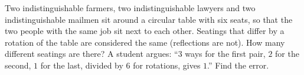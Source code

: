 Two indistinguishable farmers, two indistinguishable lawyers and two indistinguishable mailmen sit around a circular table with six seats, so that the two people with the same job sit next to each other. Seatings that differ by a rotation of the table are considered the same (reflections are not). How many different seatings are there? A student argues: ``$3$ ways for the first pair, $2$ for the second, $1$ for the last, divided by $6$ for rotations, gives $1$.'' Find the error.
